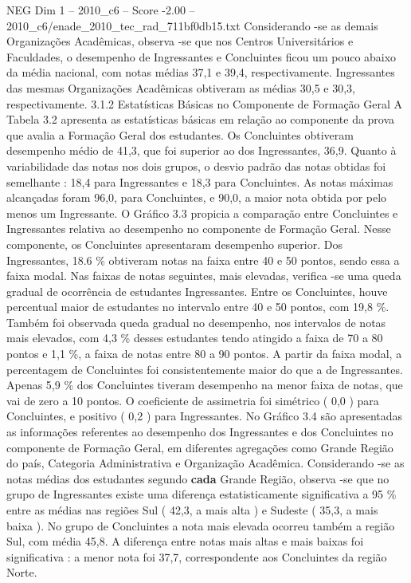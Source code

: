 \begin{textsample}{NEG Dim 1 – 2010\_c6 – Score -2.00 – 2010\_c6/enade\_2010\_tec\_rad\_711bf0db15.txt}
Considerando -se as demais Organizações Acadêmicas, observa -se que nos Centros Universitários e Faculdades, o desempenho de Ingressantes e Concluintes ficou um pouco abaixo da média nacional, com notas médias 37,1 e 39,4, respectivamente.
Ingressantes das mesmas Organizações Acadêmicas obtiveram as médias 30,5 e 30,3, respectivamente. 3.1.2 Estatísticas Básicas no Componente de Formação Geral A Tabela 3.2 apresenta as estatísticas básicas em relação ao componente da prova que avalia a Formação Geral dos estudantes.
Os Concluintes obtiveram desempenho médio de 41,3, que foi superior ao dos Ingressantes, 36,9.
Quanto à variabilidade das notas nos dois grupos, o desvio padrão das notas obtidas foi semelhante : 18,4 para Ingressantes e 18,3 para Concluintes.
As notas máximas alcançadas foram 96,0, para Concluintes, e 90,0, a maior nota obtida por pelo menos um Ingressante.
O Gráfico 3.3 propicia a comparação entre Concluintes e Ingressantes relativa ao desempenho no componente de Formação Geral.
Nesse componente, os Concluintes apresentaram desempenho superior.
Dos Ingressantes, 18.6 \% obtiveram notas na faixa entre 40 e 50 pontos, sendo essa a faixa modal.
Nas faixas de notas seguintes, mais elevadas, verifica -se uma queda gradual de ocorrência de estudantes Ingressantes.
Entre os Concluintes, houve percentual maior de estudantes no intervalo entre 40 e 50 pontos, com 19,8 \%.
Também foi observada queda gradual no desempenho, nos intervalos de notas mais elevados, com 4,3 \% desses estudantes tendo atingido a faixa de 70 a 80 pontos e 1,1 \%, a faixa de notas entre 80 a 90 pontos.
A partir da faixa modal, a percentagem de Concluintes foi consistentemente maior do que a de Ingressantes.
Apenas 5,9 \% dos Concluintes tiveram desempenho na menor faixa de notas, que vai de zero a 10 pontos.
O coeficiente de assimetria foi simétrico ( 0,0 ) para Concluintes, e positivo ( 0,2 ) para Ingressantes.
No Gráfico 3.4 são apresentadas as informações referentes ao desempenho dos Ingressantes e dos Concluintes no componente de Formação Geral, em diferentes agregações como Grande Região do país, Categoria Administrativa e Organização Acadêmica.
Considerando -se as notas médias dos estudantes segundo \textbf{cada} Grande Região, observa -se que no grupo de Ingressantes existe uma diferença estatisticamente significativa a 95 \% entre as médias nas regiões Sul ( 42,3, a mais alta ) e Sudeste ( 35,3, a mais baixa ).
No grupo de Concluintes a nota mais elevada ocorreu também a região Sul, com média 45,8.
A diferença entre notas mais altas e mais baixas foi significativa : a menor nota foi 37,7, correspondente aos Concluintes da região Norte.

\end{textsample}
